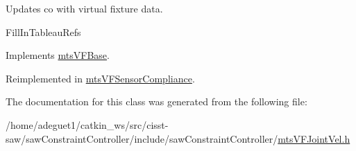 Updates co with virtual fixture data. 

Fill\-In\-Tableau\-Refs 

Implements \hyperlink{classmts_v_f_base_aef5a28675f79945766a2b114c957ae6f}{mts\-V\-F\-Base}.



Reimplemented in \hyperlink{classmts_v_f_sensor_compliance_ade8b115639befe8b99fbe700ef092c06}{mts\-V\-F\-Sensor\-Compliance}.



The documentation for this class was generated from the following file\-:\begin{DoxyCompactItemize}
\item 
/home/adeguet1/catkin\-\_\-ws/src/cisst-\/saw/saw\-Constraint\-Controller/include/saw\-Constraint\-Controller/\hyperlink{mts_v_f_joint_vel_8h}{mts\-V\-F\-Joint\-Vel.\-h}\end{DoxyCompactItemize}
